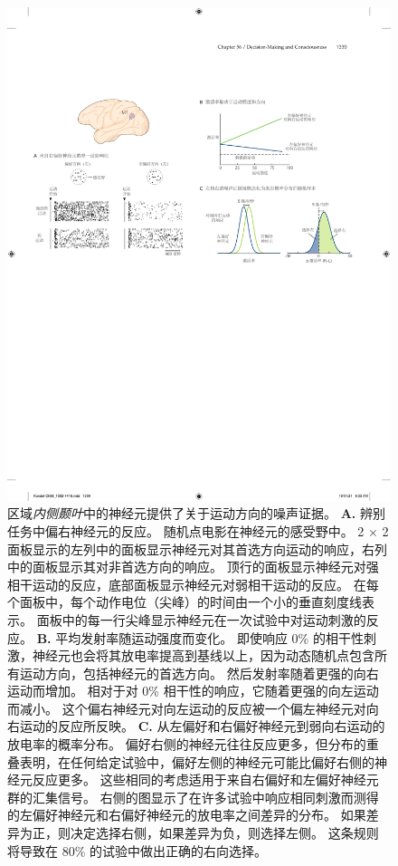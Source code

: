 \begin{figure}[htbp]
	\centering
	\includegraphics[width=1.0\linewidth]{chap56/fig_56_4}
	\caption{区域\textit{内侧颞叶}中的神经元提供了关于运动方向的噪声证据。
		\textbf{A.} 辨别任务中偏右神经元的反应。 随机点电影在神经元的感受野中。
		2 × 2 面板显示的左列中的面板显示神经元对其首选方向运动的响应，右列中的面板显示其对非首选方向的响应。
		顶行的面板显示神经元对强相干运动的反应，底部面板显示神经元对弱相干运动的反应。
		在每个面板中，每个动作电位（尖峰）的时间由一个小的垂直刻度线表示。
		面板中的每一行尖峰显示神经元在一次试验中对运动刺激的反应\cite{mazurek2003role}。
		\textbf{B.} 平均发射率随运动强度而变化。
		即使响应 0\% 的相干性刺激，神经元也会将其放电率提高到基线以上，因为动态随机点包含所有运动方向，包括神经元的首选方向。
		然后发射率随着更强的向右运动而增加。
		相对于对 0\% 相干性的响应，它随着更强的向左运动而减小。
		这个偏右神经元对向左运动的反应被一个偏左神经元对向右运动的反应所反映。
		\textbf{C.} 从左偏好和右偏好神经元到弱向右运动的放电率的概率分布。
		偏好右侧的神经元往往反应更多，但分布的重叠表明，在任何给定试验中，偏好左侧的神经元可能比偏好右侧的神经元反应更多。
		这些相同的考虑适用于来自右偏好和左偏好神经元群的汇集信号。
		右侧的图显示了在许多试验中响应相同刺激而测得的左偏好神经元和右偏好神经元的放电率之间差异的分布。
		如果差异为正，则决定选择右侧，如果差异为负，则选择左侧。
		这条规则将导致在 80\% 的试验中做出正确的右向选择。}
	\label{fig:56_4}
\end{figure}


